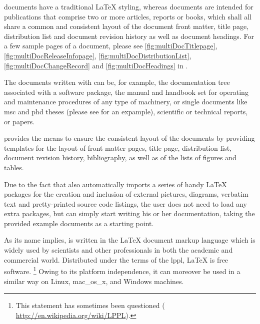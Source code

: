 \smallskip

\singledoc documents have a traditional \LaTeX{} styling, whereas \multidoc
documents are intended for publications that comprise two or more articles,
reports or books, which shall all share a common and consistent layout of
the document front matter, \EG{} title page, distribution list and document
revision history as well as document headings. For a few sample pages of a
\multidoc document, please see \autoref{fig:multiDocTitlepage},
\autoref{fig:multiDocReleaseInfopage},
\autoref{fig:multiDocDistributionList}, \autoref{fig:multiDocChangeRecord}
and \autoref{fig:multiDocHeadings} in
.

The documents written with \wegcLaTeX{} can be, for example, the
documentation tree associated with a software package, the manual and
handbook set for operating and maintenance procedures of any type of machinery, 
or single documents like \ac{msc} and \ac{phd} theses 
(please see  for an expample),
scientific or technical reports, or papers.

\wegcLaTeX{} provides the means to ensure the consistent layout of the
documents by providing templates for the layout of front matter pages,
title page, distribution list, document revision history, bibliography, as
well as of the lists of figures and tables.

Due to the fact that \wegcLaTeX{} also automatically imports a series of
handy \LaTeX{} packages for the creation and inclusion of external
pictures, diagrams, verbatim text and pretty-printed source code listings,
the user does not need to load any extra packages, but can simply start
writing his or her documentation, taking the provided example documents as
a starting point.

As its name implies, \wegcLaTeX{} is written in the \LaTeX{} document
markup language which is widely used by scientists and other professionals
in both the academic and commercial world.  Distributed under the terms of
the \ac{lppl}, \LaTeX{} is free software.%
\footnote{%
  This statement has sometimes been questioned (\CF{}
  \url{http://en.wikipedia.org/wiki/LPPL}).%
} %
Owing to its platform independence, it can moreover be used in a similar
way on Linux, \ac{mac_os_x}, and Windows machines.

